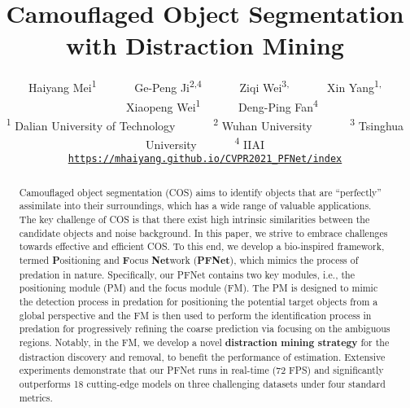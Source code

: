 \documentclass[final]{cvpr}
\begin{document}
\title{Camouflaged Object Segmentation with Distraction Mining}

\author{
Haiyang Mei\textsuperscript{1} \ \ \ \ \ \ 
Ge-Peng Ji\textsuperscript{2,4} \ \ \ \ \ \  
Ziqi Wei\textsuperscript{3,} \ \ \ \ \ \  
Xin Yang\textsuperscript{1,} \ \ \ \ \ \ 
Xiaopeng Wei\textsuperscript{1} \ \ \ \ \ \ 
Deng-Ping Fan\textsuperscript{4}
\\
\textsuperscript{1} Dalian University of Technology \ \ \ \ \ \ 
\textsuperscript{2} Wuhan University \ \ \ \ \ \ 
\textsuperscript{3} Tsinghua University \ \ \ \ \ \   
\textsuperscript{4} IIAI
\\
{\tt\small \url{https://mhaiyang.github.io/CVPR2021_PFNet/index}}
}

\maketitle

\renewcommand{\thefootnote}{}


\thispagestyle{empty}

\begin{abstract}
Camouflaged object segmentation (COS) aims to identify objects that are ``perfectly'' assimilate into their surroundings, which has a wide range of valuable applications.
The key challenge of COS is that there exist high intrinsic similarities between the candidate objects and noise background.
In this paper, we strive to embrace challenges towards effective and efficient COS.
To this end, we develop a bio-inspired framework, termed \textbf{P}ositioning and \textbf{F}ocus \textbf{Net}work (\textbf{PFNet}), which mimics the process of predation in nature.
Specifically, our PFNet contains two key modules, i.e., the positioning module (PM) and the focus module (FM).
The PM is designed to mimic the detection process in predation for positioning the potential target objects from a global perspective and the FM is then used to perform the identification process in predation for progressively refining the coarse prediction via focusing on the ambiguous regions.
Notably, in the FM, we develop a novel \textbf{distraction mining strategy} for the distraction discovery and removal, to benefit the performance of estimation.
Extensive experiments demonstrate that our PFNet runs in real-time (72 FPS) and significantly outperforms 18 cutting-edge models on three challenging datasets under four standard metrics.
\end{abstract}
\end{document}
